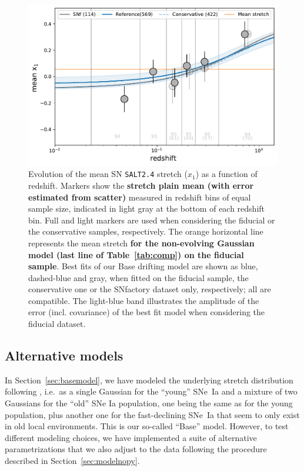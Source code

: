 \documentclass[]{aa}
\begin{document}
\begin{figure}
    \centering
    \includegraphics[width=0.7\linewidth]{Article_figures/stretchevol_all_vs_snf-mean.pdf}
    \caption{Evolution of the mean SN \textsc{\texttt{SALT2.4}} stretch ($x_1$)
        as a function of redshift. Markers show the \textbf{stretch plain mean
        (with error estimated from scatter)} measured in redshift bins of equal
        sample size, indicated in light gray at the bottom of each redshift bin.
        Full and light markers are used when considering the fiducial or the
        conservative samples, respectively. The orange horizontal line
        represents the mean stretch \textbf{for the non-evolving Gaussian model
        (last line of Table~\ref{tab:comp}) on the fiducial sample}. Best
        fits of our Base drifting model are shown as blue, dashed-blue and
        gray, when fitted on the fiducial sample, the conservative one or
        the SNfactory dataset only, respectively; all are compatible. The
        light-blue band illustrates the amplitude of the error (incl.
        covariance) of the best fit model when considering the fiducial
    dataset.}
    \label{fig:modelall}
\end{figure}

\subsection{Alternative models}\label{sec:othermodel}

In Section~\ref{sec:basemodel}, we have modeled the underlying stretch
distribution following \cite{rigault2020}, i.e.\ as a single Gaussian for the
``young'' SNe~Ia and a mixture of two Gaussians for the ``old'' SNe Ia
population, one being the same as for the young population, plus another one for
the fast-declining SNe~Ia that seem to only exist in old local environments.
This is our so-called ``Base'' model. However, to test different modeling
choices, we have implemented a suite of alternative parametrizations that we
also adjust to the data following the procedure described in
Section~\ref{sec:modelnopy}. 
\end{document}
